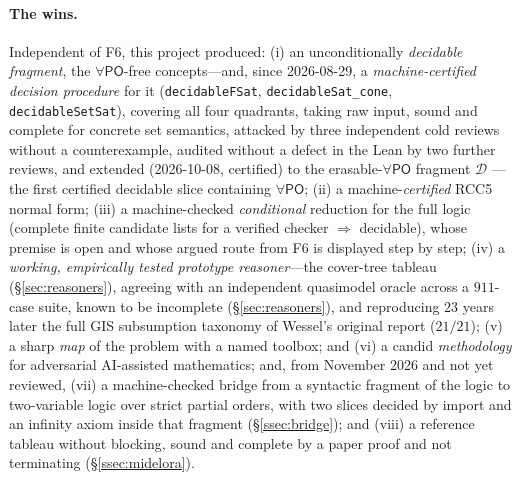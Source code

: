 \documentclass[11pt]{article}
\newcommand{\PO}{\mathsf{PO}}
\newcommand{\code}[1]{\texttt{#1}}
\theoremstyle{plain}
\theoremstyle{definition}
\begin{document}
\paragraph{The wins.} Independent of F6, this project produced:
(i) an unconditionally \emph{decidable fragment}, the $\forall\PO$-free
concepts---and, since 2026-08-29, a \emph{machine-certified decision
procedure} for it (\code{decidableFSat}, \code{decidableSat\_cone},
\code{decidableSetSat}), covering all four quadrants, taking raw input, sound
and complete for concrete set semantics, attacked by three independent
cold reviews without a counterexample, audited without a defect in the Lean by
two further reviews, and extended (2026-10-08, certified) to the
erasable-$\forall\PO$ fragment $\mathcal D$ --- the first certified decidable
slice containing $\forall\PO$; (ii) a machine-\emph{certified} RCC5
normal form; (iii) a
machine-checked \emph{conditional} reduction for the full logic (complete
finite candidate lists for a verified checker $\Rightarrow$ decidable), whose
premise is open and whose argued route from F6 is displayed step by step;
(iv) a \emph{working, empirically tested prototype reasoner}---the
cover-tree tableau (\S\ref{sec:reasoners}), agreeing with an independent
quasimodel oracle across a $911$-case suite, known to be incomplete
(\S\ref{sec:reasoners}), and reproducing $23$ years later
the full GIS subsumption taxonomy of Wessel's original report ($21/21$);
(v) a sharp \emph{map} of the problem with a named toolbox; and
(vi) a candid \emph{methodology} for adversarial AI-assisted mathematics; and,
from November 2026 and not yet reviewed, (vii) a machine-checked bridge from a
syntactic fragment of the logic to two-variable logic over strict partial
orders, with two slices decided by import and an infinity axiom inside that
fragment (\S\ref{ssec:bridge}); and (viii) a reference
tableau without blocking, sound and complete by a paper proof and not
terminating (\S\ref{ssec:midelora}).
\end{document}
